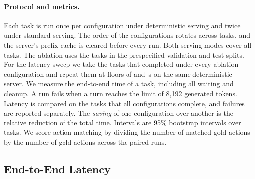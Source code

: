 \paragraph{Protocol and metrics.}
Each task is run once per configuration under deterministic serving and twice under standard serving.
The order of the configurations rotates across tasks, and the server's prefix cache is cleared before every run.
Both serving modes cover all \DetPlanned{} tasks. The ablation uses the \AblIdentPlanned{} tasks in the prespecified validation and test splits.
For the latency sweep we take the \AblTasks{} tasks that completed under every ablation configuration and repeat them at floors of \ToolMidFloor{} and \ToolHighFloor\,s on the same deterministic server.
We measure the end-to-end time of a task, including all waiting and cleanup.
A run fails when a turn reaches the limit of 8{,}192 generated tokens.
Latency is compared on the tasks that all configurations complete, and failures are reported separately.
The \emph{saving} of one configuration over another is the relative reduction of the total time.
Intervals are 95\% bootstrap intervals over tasks.
We score action matching by dividing the number of matched gold actions by the number of gold actions across the paired runs.

\subsection{End-to-End Latency}
\label{sec:exp:latency}

